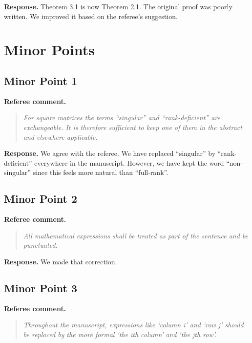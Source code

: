 \documentclass[11pt]{article}
\newenvironment{refereecomment}
{\par\smallskip\noindent\textbf{\color{commentblue}Referee comment.}
\begin{quote}\itshape}
  {
\end{quote}}
\newenvironment{authorresponse}
{\par\smallskip\noindent\textbf{\color{responsegreen}Response.}}
{\par\smallskip}
\begin{document}
\begin{authorresponse}
  Theorem 3.1 is now Theorem 2.1. The original proof was poorly written. We improved it based on the referee's suggestion.
\end{authorresponse}

\section*{Minor Points}

\subsection*{Minor Point 1}

\begin{refereecomment}
  For square matrices the terms “singular” and “rank-deficient” are exchangeable. It is therefore sufficient to keep one of them in the abstract and elsewhere applicable.
\end{refereecomment}

\begin{authorresponse}
  We agree with the referee. We have replaced ``singular'' by ``rank-deficient'' everywhere in the manuscript. However, we have kept the word ``non-singular'' since this feels more natural than ``full-rank''.
\end{authorresponse}

\subsection*{Minor Point 2}

\begin{refereecomment}
  All mathematical expressions shall be treated as part of the sentence and be punctuated.
\end{refereecomment}

\begin{authorresponse}
  We made that correction.
\end{authorresponse}

\subsection*{Minor Point 3}

\begin{refereecomment}
  Throughout the manuscript, expressions like ‘column i’ and ‘row j’ should be replaced by the more formal ‘the ith column’ and ‘the jth row’.
\end{refereecomment}
\end{document}

